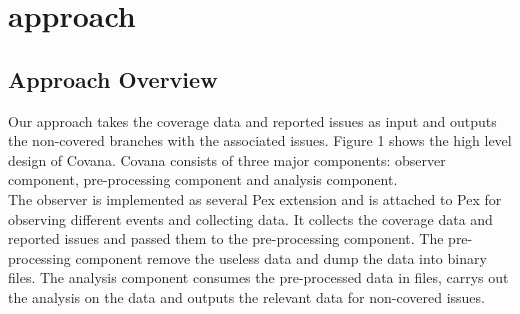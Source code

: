 \section{approach}
\subsection{Approach Overview}
Our approach takes the coverage data and reported issues as input and outputs the non-covered branches with the associated issues. Figure 1 shows the high level design of Covana. Covana consists of three major components: observer component, pre-processing component and analysis component.
\\The observer is implemented as several Pex extension and is attached to Pex for observing different events and collecting data. It collects the coverage data and reported issues and passed them to the pre-processing component. The pre-processing component remove the useless data and dump the data into binary files. The analysis component consumes the pre-processed data in files, carrys out the analysis on the data and outputs the relevant data for non-covered issues.
